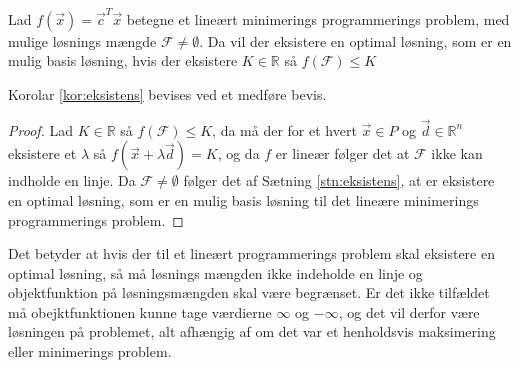 \begin{kor}
Lad $f(\vec{x}) = \vec{c}^T\vec{x}$ betegne et lineært minimerings programmerings problem, med mulige løsnings mængde $\mathcal{F} \neq \emptyset$. 
Da vil der eksistere en optimal løsning, som er en mulig basis løsning, hvis der eksistere $K \in \mathds{R}$ så $f(\mathcal{F}) \leq K$ 
\label{kor:eksistens}
\end{kor}
Korolar \ref{kor:eksistens} bevises ved et medføre bevis.
\begin{proof}
Lad  $K \in \mathds{R}$ så $f(\mathcal{F}) \leq K$, da må der for et hvert $\vec{x} \in P$ og $\vec{d} \in \mathds{R}^n$ eksistere et $\lambda$ så $f(\vec{x}+\lambda \vec{d}) = K$, og da $f$ er lineær følger det at $\mathcal{F}$ ikke kan indholde en linje. 
Da $\mathcal{F} \neq \emptyset$ følger det af Sætning \ref{stn:eksistens}, at er eksistere en optimal løsning, som er en mulig basis løsning til det lineære minimerings programmerings problem.
\end{proof}
Det betyder at hvis der til et lineært programmerings problem skal eksistere en optimal løsning, så må løsnings mængden ikke indeholde en linje og objektfunktion på løsningsmængden skal være begrænset. 
Er det ikke tilfældet må obejktfunktionen kunne tage værdierne $\infty$ og $-\infty$, og det vil derfor være løsningen på problemet, alt afhængig af om det var et henholdsvis maksimering eller minimerings problem.

